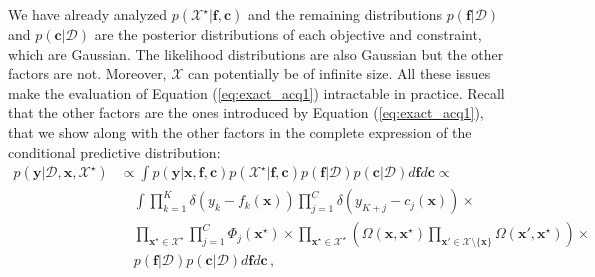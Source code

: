 We have already analyzed $p(\mathcal{X}^{\star}|\textbf{f},\textbf{c})$ and the remaining distributions $p(\textbf{f}|\mathcal{D})$ and $p(\textbf{c}|\mathcal{D})$ are the posterior distributions of each objective and constraint, which are Gaussian. The likelihood distributions are also Gaussian but the other factors are not. Moreover, $\mathcal{X}$ can potentially be of infinite size. All these issues make the evaluation of Equation (\ref{eq:exact_acq1}) intractable in
practice. Recall that the other factors are the ones introduced by Equation (\ref{eq:exact_acq1}), that we show along with the other factors in the complete expression of the conditional predictive distribution:
\begin{align}
p(\textbf{y}|\mathcal{D}, \textbf{x}, \mathcal{X}^{\star}) & \propto 
        \int p(\textbf{y}|\textbf{x},\textbf{f},\textbf{c}) 
        p(\mathcal{X}^{\star}|\textbf{f},\textbf{c}) p(\textbf{f}|\mathcal{D}) p(\textbf{c}|\mathcal{D})
 d\textbf{f} d\textbf{c} \propto \nonumber \\ & \quad
\int \prod\limits_{k=1}^{K} \delta (y_k - f_k(\textbf{x})) \prod\limits_{j=1}^{C} \delta (y_{K+j} - c_j(\textbf{x})) \times \nonumber \\ & \quad 
        \prod_{\textbf{x}^\star\in \mathcal{X}^\star} 
        \prod_{j=1}^{C}\Phi_j(\textbf{x}^{\star})
\times
        \prod_{\textbf{x}^\star \in \mathcal{X}^\star}
        \left(
        \Omega(\textbf{x},\textbf{x}^{\star})
        \prod_{\textbf{x}'\in \mathcal{X} \setminus \{\mathbf{x}\}} 
        \Omega(\textbf{x}',\textbf{x}^{\star})
        \right) \times \nonumber \\ & \quad
        p(\textbf{f}|\mathcal{D})p(\textbf{c}|\mathcal{D}) d\textbf{f}d\textbf{c}\,,
        \label{eq:exact_acqq}
\end{align}

